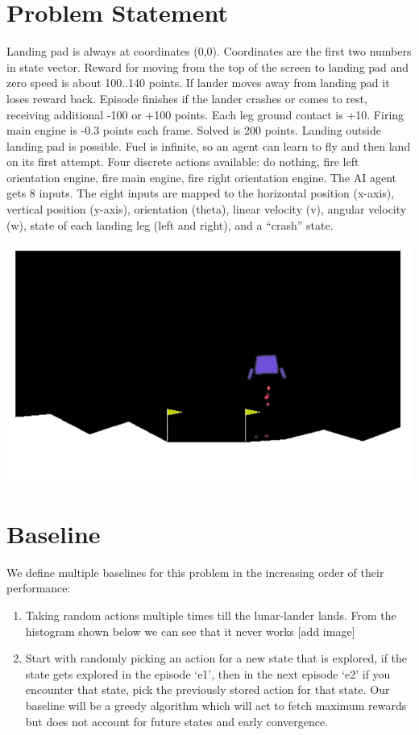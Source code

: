 \documentclass[12pt]{article}
\begin{document}
\section{Problem Statement}
Landing pad is always at coordinates (0,0). Coordinates are the first two numbers in state vector. Reward for moving from the top of the screen to landing pad and zero speed is about 100..140 points. If lander moves away from landing pad it loses reward back. Episode finishes if the lander crashes or comes to rest, receiving additional -100 or +100 points. Each leg ground contact is +10. Firing main engine is -0.3 points each frame. Solved is 200 points. Landing outside landing pad is possible. Fuel is infinite, so an agent can learn to fly and then land on its first attempt. Four discrete actions available: do nothing, fire left orientation engine, fire main engine, fire right orientation engine. The AI agent gets 8 inputs. The eight inputs are mapped to the horizontal position (x-axis), vertical position (y-axis), orientation (theta), linear velocity (v), angular velocity (w), state of each landing leg (left and right), and a “crash” state.
\begin{center}
\includegraphics[scale=0.5]{LunarLanderDemoImage.png}
\end{center}

\section{Baseline}
We define multiple baselines for this problem in the increasing order of their performance:
\begin{enumerate}[label=(\alph*)]
\item Taking random actions multiple times till the lunar-lander lands. From the histogram shown below we can see that it never works [add image]
\item Start with randomly picking an action for a new state that is explored, if the state gets explored in the episode ‘e1’, then in the next episode ‘e2’ if you encounter that state, pick the previously stored action for that state. Our baseline will be a greedy algorithm which will act to  fetch maximum rewards but does not account for future states and early convergence.
\end{enumerate}
\end{document}
